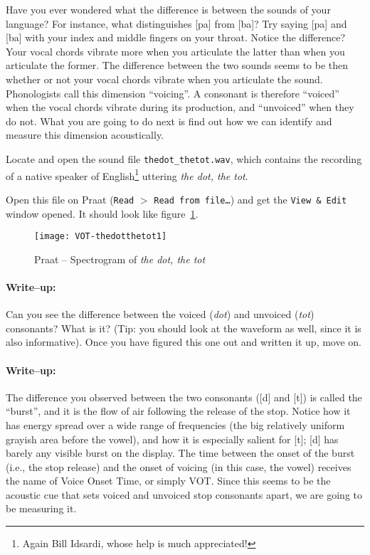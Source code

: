 \documentclass{article}
\newcommand{\soft}[1]{\textsf{#1}}
\newcommand{\filefmat}[1]{\texttt{#1}}
\newcommand{\softmenu}[1]{\texttt{#1}}
\newcommand{\Praat}{\soft{Praat}}
\begin{document}
Have you ever wondered what the difference is between the sounds of your language? For instance, what distinguishes [pa] from [ba]? Try saying [pa] and [ba] with your index and middle fingers on your throat. Notice the difference? Your vocal chords vibrate more when you articulate the latter than when you articulate the former. The difference between the two sounds seems to be then whether or not your vocal chords vibrate when you articulate the sound. Phonologists call this dimension ``voicing''. A consonant is therefore ``voiced'' when the vocal chords vibrate during its production, and ``unvoiced'' when they do not. What you are going to do next is find out how we can identify and measure this dimension acoustically.

Locate and open the sound file \filefmat{thedot\_thetot.wav}, which contains the recording of a native speaker of English\footnote{Again Bill Idsardi, whose help is much appreciated!} uttering \emph{the dot, the tot}.

Open this file on \Praat{} (\softmenu{Read} $>$ \softmenu{Read from file\ldots}) and get the \softmenu{View \& Edit} window opened. It should look like figure~\ref{step1VOT}.

\begin{figure}[!tbp]
\caption{\Praat{} -- Spectrogram of \emph{the dot, the tot}}
\label{step1VOT}
	\begin{center}
		\texttt{[image: VOT-thedotthetot1]}
	\end{center}
\end{figure}

\paragraph{Write--up:} Can you see the difference between the voiced (\emph{dot}) and unvoiced (\emph{tot}) consonants? What is it? (Tip: you should look at the waveform as well, since it is also informative). Once you have figured this one out and written it up, move on.

\paragraph{Write--up:} The difference you observed between the two consonants ([d] and [t]) is called the ``burst'', and it is the flow of air following the release of the stop. Notice how it has energy spread over a wide range of frequencies (the big relatively uniform grayish area before the vowel), and how it is especially salient for [t]; [d] has barely any visible burst on the display. The time between the onset of the burst (i.e., the stop release) and the onset of voicing (in this case, the vowel) receives the name of Voice Onset Time, or simply VOT. Since this seems to be the acoustic cue that sets voiced and unvoiced stop consonants apart, we are going to be measuring it.
\end{document}
